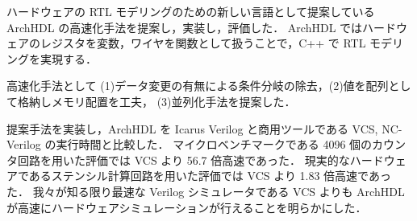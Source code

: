 ハードウェアの RTL モデリングのための新しい言語として提案している ArchHDL の高速化手法を提案し，実装し，評価した．
ArchHDL ではハードウェアのレジスタを変数，ワイヤを関数として扱うことで，C++ で RTL モデリングを実現する．

高速化手法として (1)データ変更の有無による条件分岐の除去，(2)値を配列として格納しメモリ配置を工夫，
(3)並列化手法を提案した．

提案手法を実装し，ArchHDL を Icarus Verilog と商用ツールである VCS, NC-Verilog の実行時間と比較した．
マイクロベンチマークである 4096 個のカウンタ回路を用いた評価では VCS より 56.7 倍高速であった．
現実的なハードウェアであるステンシル計算回路を用いた評価では VCS より 1.83 倍高速であった．
我々が知る限り最速な Verilog シミュレータである VCS よりも ArchHDL が高速にハードウェアシミュレーションが行えることを明らかにした．
